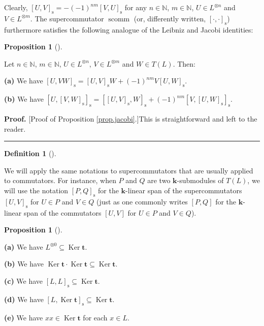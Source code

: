 \documentclass[numbers=enddot,12pt,final,onecolumn,notitlepage]{scrartcl}%
\theoremstyle{definition}
\newtheorem{prop}[theo]{Proposition}
\newenvironment{proposition}[1][]
{\begin{prop}[#1]\begin{leftbar}}
{\end{leftbar}\end{prop}}
\newtheorem{defi}[theo]{Definition}
\newenvironment{definition}[1][]
{\begin{defi}[#1]\begin{leftbar}}
{\end{leftbar}\end{defi}}
\newenvironment{proof}[1][Proof]{\noindent\textbf{#1.} }{\ \rule{0.5em}{0.5em}}
\begin{document}
Clearly, $\left[  U,V\right]  _{\operatorname*{s}}=-\left(  -1\right)
^{nm}\left[  V,U\right]  _{\operatorname*{s}}$ for any $n\in\mathbb{N}$,
$m\in\mathbb{N}$, $U\in L^{\otimes n}$ and $V\in L^{\otimes m}$. The
supercommutator $\operatorname*{scomm}$ (or, differently written, $\left[
\cdot,\cdot\right]  _{\operatorname*{s}}$) furthermore satisfies the following
analogue of the Leibniz and Jacobi identities:

\begin{proposition}
\label{prop.jacobi}Let $n\in\mathbb{N}$, $m\in\mathbb{N}$, $U\in L^{\otimes
n}$, $V\in L^{\otimes m}$ and $W\in T\left(  L\right)  $. Then: \medskip

\textbf{(a)} We have $\left[  U,VW\right]  _{\operatorname*{s}}=\left[
U,V\right]  _{\operatorname*{s}}W+\left(  -1\right)  ^{nm}V\left[  U,W\right]
_{\operatorname*{s}}$. \medskip

\textbf{(b)} We have $\left[  U,\left[  V,W\right]  _{\operatorname*{s}%
}\right]  _{\operatorname*{s}}=\left[  \left[  U,V\right]  _{\operatorname*{s}%
},W\right]  _{\operatorname*{s}}+\left(  -1\right)  ^{nm}\left[  V,\left[
U,W\right]  _{\operatorname*{s}}\right]  _{\operatorname*{s}}$.
\end{proposition}

\begin{proof}
[Proof of Proposition \ref{prop.jacobi}.]This is straightforward and left to
the reader.
\end{proof}

\begin{definition}
We will apply the same notations to supercommutators that are usually applied
to commutators. For instance, when $P$ and $Q$ are two $\mathbf{k}$-submodules
of $T\left(  L\right)  $, we will use the notation $\left[  P,Q\right]
_{\operatorname*{s}}$ for the $\mathbf{k}$-linear span of the supercommutators
$\left[  U,V\right]  _{\operatorname*{s}}$ for $U\in P$ and $V\in Q$ (just as
one commonly writes $\left[  P,Q\right]  $ for the $\mathbf{k}$-linear span of
the commutators $\left[  U,V\right]  $ for $U\in P$ and $V\in Q$).
\end{definition}

\begin{proposition}
\label{prop.3}\textbf{(a)} We have $L^{\otimes0}\subseteq\operatorname*{Ker}%
\mathbf{t}$. \medskip

\textbf{(b)} We have $\operatorname*{Ker}\mathbf{t}\cdot\operatorname*{Ker}%
\mathbf{t}\subseteq\operatorname*{Ker}\mathbf{t}$. \medskip

\textbf{(c)} We have $\left[  L,L\right]  _{\operatorname*{s}}\subseteq
\operatorname*{Ker}\mathbf{t}$. \medskip

\textbf{(d)} We have $\left[  L,\operatorname*{Ker}\mathbf{t}\right]
_{\operatorname*{s}}\subseteq\operatorname*{Ker}\mathbf{t}$. \medskip

\textbf{(e)} We have $xx\in\operatorname*{Ker}\mathbf{t}$ for each $x\in L$.
\end{proposition}
\end{document}
